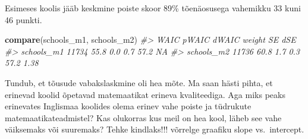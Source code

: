 \documentclass[]{book}
\newenvironment{Shaded}{\begin{snugshade}}{\end{snugshade}}
\newcommand{\KeywordTok}[1]{\textcolor[rgb]{0.13,0.29,0.53}{\textbf{#1}}}
\newcommand{\DataTypeTok}[1]{\textcolor[rgb]{0.13,0.29,0.53}{#1}}
\newcommand{\DecValTok}[1]{\textcolor[rgb]{0.00,0.00,0.81}{#1}}
\newcommand{\StringTok}[1]{\textcolor[rgb]{0.31,0.60,0.02}{#1}}
\newcommand{\CommentTok}[1]{\textcolor[rgb]{0.56,0.35,0.01}{\textit{#1}}}
\newcommand{\OperatorTok}[1]{\textcolor[rgb]{0.81,0.36,0.00}{\textbf{#1}}}
\newcommand{\NormalTok}[1]{#1}
\begin{document}
\begin{Shaded}
\end{Shaded}

Esimeses koolis jääb keskmine poiste skoor 89\% tõenäosusega vahemikku
33 kuni 46 punkti.

\begin{Shaded}
\begin{Highlighting}[]
\KeywordTok{compare}\NormalTok{(schools_m1, schools_m2)}
\CommentTok{#>             WAIC pWAIC dWAIC weight   SE  dSE}
\CommentTok{#> schools_m1 11734  55.8   0.0    0.7 57.2   NA}
\CommentTok{#> schools_m2 11736  60.8   1.7    0.3 57.2 1.38}
\end{Highlighting}
\end{Shaded}

Tundub, et tõusude vabakslaskmine oli hea mõte. Ma saan hästi pihta, et
erinevad koolid õpetavad matemaatikat erineva kvaliteediga. Aga miks
peaks erinevates Inglismaa koolides olema erinev vahe poiste ja
tüdrukute matemaatikateadmistel? Kas olukorras kus meil on hea kool,
läheb see vahe väiksemaks või suuremaks? Tehke kindlaks!!! võrrelge
graafiku slope vs.~intercept.
\end{document}
